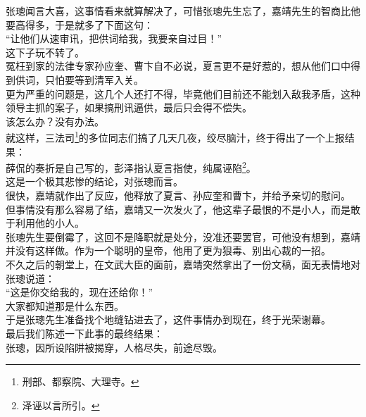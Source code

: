 \begin{multicols}{\theparacolNo}
张璁闻言大喜，这事情看来就算解决了，可惜张璁先生忘了，嘉靖先生的智商比他要高得多，于是就多了下面这句：\\

“让他们从速审讯，把供词给我，我要亲自过目！”\\

这下子玩不转了。\\

冤枉到家的法律专家孙应奎、曹卞自不必说，夏言更不是好惹的，想从他们口中得到供词，只怕要等到清军入关。\\

更为严重的问题是，这几个人还打不得，毕竟他们目前还不能划入敌我矛盾，这种领导主抓的案子，如果搞刑讯逼供，最后只会得不偿失。\\

该怎么办？没有办法。\\

就这样，三法司\footnote{刑部、都察院、大理寺。}的多位同志们搞了几天几夜，绞尽脑汁，终于得出了一个上报结果：\\

薛侃的奏折是自己写的，彭泽指认夏言指使，纯属诬陷\footnote{泽诬以言所引。}。\\

这是一个极其悲惨的结论，对张璁而言。\\

很快，嘉靖就作出了反应，他释放了夏言、孙应奎和曹卞，并给予亲切的慰问。\\

但事情没有那么容易了结，嘉靖又一次发火了，他这辈子最恨的不是小人，而是敢于利用他的小人。\\

张璁先生要倒霉了，这回不是降职就是处分，没准还要罢官，可他没有想到，嘉靖并没有这样做。作为一个聪明的皇帝，他用了更为狠毒、别出心裁的一招。\\

不久之后的朝堂上，在文武大臣的面前，嘉靖突然拿出了一份文稿，面无表情地对张璁说道：\\

“这是你交给我的，现在还给你！”\\

大家都知道那是什么东西。\\

于是张璁先生准备找个地缝钻进去了，这件事情办到现在，终于光荣谢幕。\\

最后我们陈述一下此事的最终结果：\\

张璁，因所设陷阱被揭穿，人格尽失，前途尽毁。\\


\end{multicols}
